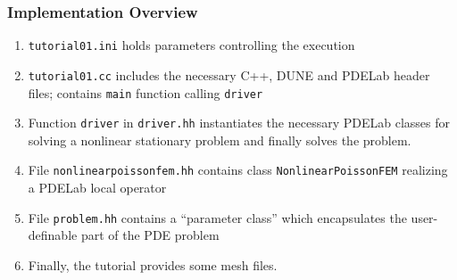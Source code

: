 \documentclass[aspectratio=169,11pt]{beamer}
\theoremstyle{definition}
\begin{document}
\begin{frame}
\frametitle{Implementation Overview}
\begin{enumerate}[1)]
\item \lstinline{tutorial01.ini} holds parameters controlling the execution
\item \lstinline{tutorial01.cc} includes the necessary C++,
DUNE and PDELab header files; contains \lstinline{main} function calling
\lstinline{driver}
\item Function \lstinline{driver} in \lstinline{driver.hh} instantiates the necessary PDELab classes
for solving a nonlinear stationary problem and finally solves the problem.
\item File \lstinline{nonlinearpoissonfem.hh} contains class
\lstinline{NonlinearPoissonFEM} realizing a PDELab local operator
\item File \lstinline{problem.hh} contains a ``parameter class'' which
encapsulates the user-definable part of the PDE problem
\item Finally, the tutorial provides some mesh files.
\end{enumerate}
\end{frame}
\end{document}
